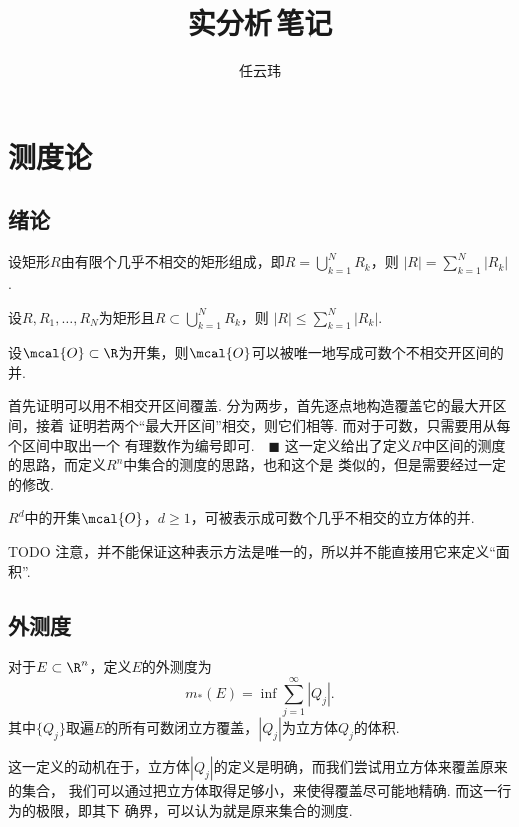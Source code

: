 

\title{实分析$\,$笔记}
\author{任云玮}
\date{}



\maketitle
\tableofcontents
\newpage

\section{测度论}

\subsection{绪论}

  \begin{lemma}
    设矩形$R$由有限个几乎不相交的矩形组成，即$R=\bigcup_{k=1}^N R_k$，则
    $|R|=\sum_{k=1}^N|R_k|$.
  \end{lemma}

  \begin{lemma}
    \label{lemma: 矩形并}
    设$R,R_1,\dots,R_N$为矩形且$R\subset\bigcup_{k=1}^N R_k$，则
    $|R|\le \sum_{k=1}^N|R_k|$.
  \end{lemma}

  \begin{thm}
    设$\mcal{O}\subset\R$为开集，则$\mcal{O}$可以被唯一地写成可数个不相交开区间的并.
  \end{thm}
  \proof
    首先证明可以用不相交开区间覆盖. 分为两步，首先逐点地构造覆盖它的最大开区间，接着
    证明若两个“最大开区间”相交，则它们相等. 而对于可数，只需要用从每个区间中取出一个
    有理数作为编号即可.$\quad\blacksquare$
  \remark
    这一定义给出了定义$R$中区间的测度的思路，而定义$R^n$中集合的测度的思路，也和这个是
    类似的，但是需要经过一定的修改.

  \begin{thm}
    $R^d$中的开集$\mcal{O}$，$d\ge 1$，可被表示成可数个几乎不相交的立方体的并.
  \end{thm}
  \proof
    TODO
  \remark
    注意，并不能保证这种表示方法是唯一的，所以并不能直接用它来定义“面积”.

\subsection{外测度}

  \begin{defi}[外测度]
    \label{defi: 外测度}
    对于$E\subset\R^n$，定义$E$的外测度为
    \[
      m_*(E) = \inf\sum_{j=1}^\infty |Q_j|.
    \]
    其中$\{Q_j\}$取遍$E$的所有可数闭立方覆盖，$|Q_j|$为立方体$Q_j$的体积.
  \end{defi}
  \remark
    这一定义的动机在于，立方体$|Q_j|$的定义是明确，而我们尝试用立方体来覆盖原来的集合，
    我们可以通过把立方体取得足够小，来使得覆盖尽可能地精确. 而这一行为的极限，即其下
    确界，可以认为就是原来集合的测度.

